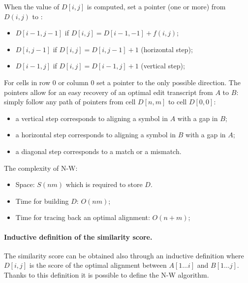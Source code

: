 
When the value of $D[i,j]$ is computed, set a pointer (one or more) from $D(i,j)$ to :
\begin{itemize}
	\item $D[i-1, j-1]$ if $D[i,j] = D[i-1,-1] + f(i,j)$;
	\item $D[i, j-1]$ if $D[i,j] = D[i,j-1] + 1$ (horizontal step);
	\item $D[i-1, j]$ if $D[i,j] = D[i-1,j] + 1$ (vertical step);
\end{itemize}
For cells in row $0$ or column $0$ set a pointer to the only possible direction. The pointers allow for an easy recovery of an optimal edit transcript from $A$ to $B$: simply follow any path of pointers from cell $D[n,m]$ to cell $D[0,0]$:
\begin{itemize}
	\item a vertical step corresponds to aligning a symbol in $A$ with a gap in $B$;
	\item a horizontal step corresponds to aligning a symbol in $B$ with a gap in $A$;
	\item a diagonal step corresponds to a match or a mismatch.
\end{itemize}


The complexity of N-W:
\begin{itemize}
	\item Space: $S(nm)$ which is required to store $D$.
	\item Time for building $D$: $O(nm)$;
	\item Time for tracing back an optimal alignment: $O(n+m)$; 
\end{itemize}


\paragraph*{Inductive definition of the similarity score.} The similarity score can be obtained also through an inductive definition where $D[i,j]$ is the score of the optimal alignment between $A[1 \dots i]$ and $B[1 \dots j]$.\\
Thanks to this definition it is possible to define the N-W algorithm.

